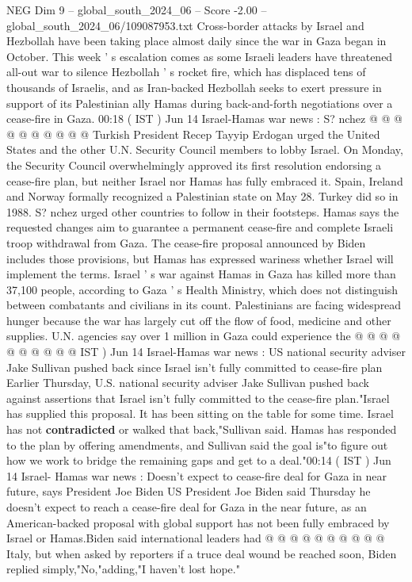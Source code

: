 \begin{textsample}{NEG Dim 9 – global\_south\_2024\_06 – Score -2.00 – global\_south\_2024\_06/109087953.txt}
Cross-border attacks by Israel and Hezbollah have been taking place almost daily since the war in Gaza began in October.
This week ' s escalation comes as some Israeli leaders have threatened all-out war to silence Hezbollah ' s rocket fire, which has displaced tens of thousands of Israelis, and as Iran-backed Hezbollah seeks to exert pressure in support of its Palestinian ally Hamas during back-and-forth negotiations over a cease-fire in Gaza. 00:18 ( IST ) Jun 14 Israel-Hamas war news : S? nchez @ @ @ @ @ @ @ @ @ @ Turkish President Recep Tayyip Erdogan urged the United States and the other U.N.
Security Council members to lobby Israel.
On Monday, the Security Council overwhelmingly approved its first resolution endorsing a cease-fire plan, but neither Israel nor Hamas has fully embraced it.
Spain, Ireland and Norway formally recognized a Palestinian state on May 28.
Turkey did so in 1988.
S? nchez urged other countries to follow in their footsteps.
Hamas says the requested changes aim to guarantee a permanent cease-fire and complete Israeli troop withdrawal from Gaza.
The cease-fire proposal announced by Biden includes those provisions, but Hamas has expressed wariness whether Israel will implement the terms.
Israel ' s war against Hamas in Gaza has killed more than 37,100 people, according to Gaza ' s Health Ministry, which does not distinguish between combatants and civilians in its count.
Palestinians are facing widespread hunger because the war has largely cut off the flow of food, medicine and other supplies.
U.N. agencies say over 1 million in Gaza could experience the @ @ @ @ @ @ @ @ @ @ IST ) Jun 14 Israel-Hamas war news : US national security adviser Jake Sullivan pushed back since Israel isn't fully committed to cease-fire plan Earlier Thursday, U.S. national security adviser Jake Sullivan pushed back against assertions that Israel isn't fully committed to the cease-fire plan."Israel has supplied this proposal.
It has been sitting on the table for some time.
Israel has not \textbf{contradicted} or walked that back,"Sullivan said.
Hamas has responded to the plan by offering amendments, and Sullivan said the goal is"to figure out how we work to bridge the remaining gaps and get to a deal."00:14 ( IST ) Jun 14 Israel- Hamas war news : Doesn't expect to cease-fire deal for Gaza in near future, says President Joe Biden US President Joe Biden said Thursday he doesn't expect to reach a cease-fire deal for Gaza in the near future, as an American-backed proposal with global support has not been fully embraced by Israel or Hamas.Biden said international leaders had @ @ @ @ @ @ @ @ @ @ Italy, but when asked by reporters if a truce deal wound be reached soon, Biden replied simply,"No,"adding,"I haven't lost hope."

\end{textsample}
